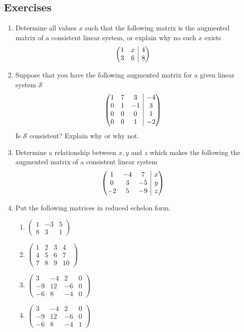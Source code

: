 \documentclass[12pt]{article}
\makeatletter
\numberwithin{equation}{subsection}
\numberwithin{figure}{subsection}
\theoremstyle{note}
\newenvironment{amatrix}[1]{%
  \left(\begin{array}{@{}*{#1}{c}|c@{}}
}{%
  \end{array}\right)
}
\makeatother
\begin{document}
\subsection{Exercises} 
\begin{enumerate}[label=\arabic*.] 


\item Determine all values $x$ such that the following matrix is the augmented matrix of a consistent linear system, or explain why no such $x$ exists 
\[ \begin{amatrix}{2} 1 & x & 4 \\ 3 & 6 & 8\end{amatrix}\]

\item Suppose that you have the following augmented matrix for a given linear system $\mathcal{S}$ \[ \begin{amatrix}{3} 1 & 7 & 3 & -4 \\ 0 & 1 & -1 & 3 \\ 0 & 0 & 0 & 1 \\ 0 & 0 & 1 & -2 \end{amatrix} \]
Is $\mathcal{S}$ consistent? Explain why or why not.

\item Determine a relationship between $x,y$ and $z$ which makes the following the augmented matrix of a consistent linear system \[ \begin{amatrix}{3} 1 & -4 & 7 & x \\ 0 & 3 & -5 & y \\ -2 & 5 & -9 & z\end{amatrix}\]

\item \label{exc-red-ech} Put the following matrices in reduced echelon form.
\begin{enumerate}
	\item $\begin{pmatrix} 1 & -3 & 5 \\ 8 & 3 & 1 \end{pmatrix}$
	\item $\begin{pmatrix} 1 & 2 & 3 & 4 \\ 4 & 5 & 6 & 7 \\ 7 & 8 & 9 & 10\end{pmatrix}$
	\item $\begin{pmatrix} 3 & -4 & 2 & 0 \\ -9 & 12 & -6 & 0 \\ -6 & 8 & -4 & 0 \end{pmatrix}$
	\item $\begin{pmatrix} 3 & -4 & 2 & 0 \\ -9 & 12 & -6 & 0 \\ -6 & 8 & -4 & 1 \end{pmatrix}$
\end{enumerate}



\end{enumerate}
\end{document}
